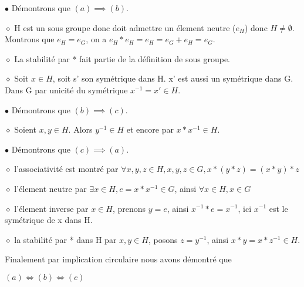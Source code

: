 \documentclass[a4paper, 12pt]{article}
\begin{document}
\begin{demonstration}
    \item $\bullet$ Démontrons que $(a) \implies (b)$.
    
        \item $\diamond$ H est un sous groupe donc doit admettre un élement neutre ($e_H$) donc $H \neq \emptyset$.
        Montrons que $e_H = e_G$, on a $e_H * e_H = e_H = e_G + e_H = e_G$.
        
        \vspace{0.5em}
        
        \item $\diamond$ La stabilité par * fait partie de la définition de sous groupe.
        
        \vspace{0.5em}
        
        \item $\diamond$ Soit $x \in H$, soit s' son symétrique dans H. x' est aussi un symétrique dans G. Dans G par unicité du symétrique $x^{-1} = x' \in H$.

    \item $\bullet$ Démontrons que $(b) \implies (c)$.
    
    \item $\diamond$ Soient $x, y \in H$. Alors $y^{-1} \in H$ et encore par $x * x^{-1} \in H$.
    
    \item $\bullet$ Démontrons que $(c) \implies (a)$.

    \item $\diamond$ l'associativité est montré par $\forall x, y, z \in H, x, y, z \in G, x * (y * z) = (x * y) * z$
    \item $\diamond$ l'élement neutre par $\exists x \in H, e = x * x^{-1} \in G$, ainsi $\forall x \in H, x \in G$
    \item $\diamond$ l'élement inverse par $x \in H$, prenons $y = e$, ainsi $x^{-1} * e = x^{-1}$, ici $x^{-1}$ est le symétrique de x dans H.
    \item $\diamond$ la stabilité par * dans H par $x, y \in H$, posons $z = y^{-1}$, ainsi $x * y = x * z^{-1} \in H$.
    
    \begin{rdem}
        Finalement par implication circulaire nous avons démontré que
        
        $(a) \iff (b) \iff (c)$
    \end{rdem}

\end{demonstration}
\end{document}
